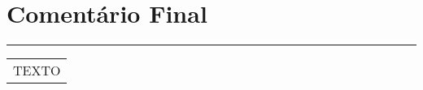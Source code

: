 \section{Comentário Final}
\vspace{-0.8cm} %
\rule{\textwidth}{2pt} %
\vspace{-0.9cm} %
\begin{table}[h]
    \begin{longtable}{|p{17.4cm}|} %
     \hline
     \rowcolor{lightgray} 
     \fontsize{8}{10}\selectfont{Acrescente observações relevantes, que não se aplicariam aos outros campos do relatório.}  
     \\ \hline \endhead
     
     \fontsize{10}{12}\selectfont 
     
     
     TEXTO
     
     
     
     \\ \hline
     \end{longtable}
     \end{table}